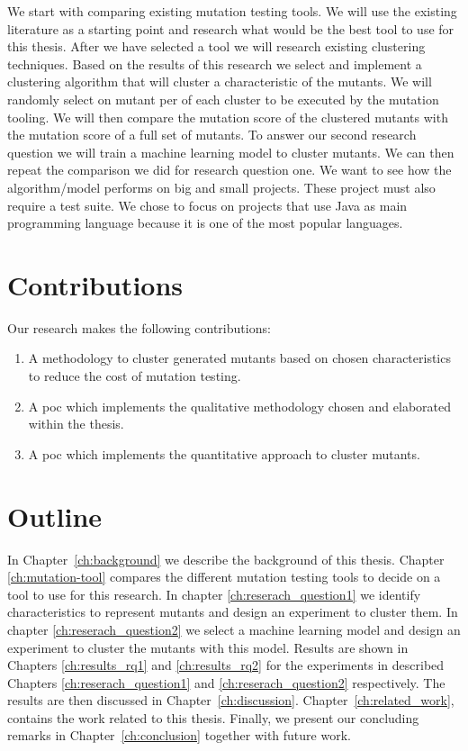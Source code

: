 \documentclass[../main]{subfiles}
\begin{document}
We start with comparing existing mutation testing tools. 
We will use the existing literature as a starting point and research what would be the best tool to use for this thesis.
\newline
After we have selected a tool we will research existing clustering techniques.
Based on the results of this research we select and implement a clustering algorithm that will cluster a characteristic of the mutants. 
We will randomly select on mutant per of each cluster to be executed by the mutation tooling.
We will then compare the mutation score of the clustered mutants with the mutation score of a full set of mutants.
\newline
To answer our second research question we will train a machine learning model to cluster mutants.
We can then repeat the comparison we did for research question one. 
\newline
We want to see how the algorithm/model performs on big and small projects.
These project must also require a test suite.
\newline
We chose to focus on projects that use Java as main programming language because it is one of the most popular languages\cite{Tiobe}.

\section{Contributions}
Our research makes the following contributions:
\begin{enumerate}
 \item A methodology to cluster generated mutants based on chosen characteristics to reduce the cost of mutation testing.
 \item A \acrfull{poc} which implements the qualitative methodology chosen and elaborated within the thesis.
 \item A \acrfull{poc} which implements the quantitative approach to cluster mutants. 
\end{enumerate}

\section{Outline}
In Chapter~\ref{ch:background} we describe the background of this thesis. 
Chapter \ref{ch:mutation-tool} compares the different mutation testing tools to decide on a tool to use for this research.
In chapter \ref{ch:reserach_question1} we identify characteristics to represent mutants and design an experiment to cluster them.
In chapter \ref{ch:reserach_question2} we select a machine learning model and design an experiment to cluster the mutants with this model.
Results are shown in Chapters \ref{ch:results_rq1} and \ref{ch:results_rq2} for the experiments in described Chapters \ref{ch:reserach_question1} and \ref{ch:reserach_question2} respectively. 
The results are then discussed in Chapter~\ref{ch:discussion}. Chapter~\ref{ch:related_work}, contains the work related to this thesis.
Finally, we present our concluding remarks in Chapter~\ref{ch:conclusion} together with future work.
\end{document}
